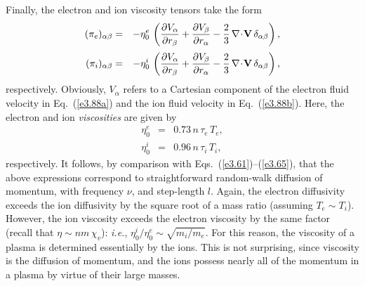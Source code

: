 Finally, the electron and ion viscosity tensors take the form
\begin{eqnarray}\label{e3.88a}
(\pi_e)_{\alpha\beta}& =& - \eta_0^e\, \left( \frac{\partial V_\alpha}{\partial r_\beta}
+ \frac{\partial V_\beta}{\partial r_\alpha} - \frac{2}{3}\,\nabla\!\cdot\!{\bf V}\,\delta_{\alpha\beta}\right),\\[0.5ex]
(\pi_i)_{\alpha\beta}& =& - \eta_0^i\, \left( \frac{\partial V_\alpha}{\partial r_\beta}
+ \frac{\partial V_\beta}{\partial r_\alpha} - \frac{2}{3}\,\nabla\!\cdot\!{\bf V}\,\delta_{\alpha\beta}
\right),\label{e3.88b}
\end{eqnarray}
respectively. Obviously, $V_\alpha$ refers to a Cartesian component of the
electron fluid velocity in Eq.~(\ref{e3.88a}) and the ion fluid velocity in Eq.~(\ref{e3.88b}).
Here, the electron and ion {\em viscosities}\/ are given
by
\begin{eqnarray}\label{e3.89a}
\eta_0^e &=& 0.73\,n\,\tau_e\,T_e,\\[0.5ex]
\eta_0^i &=& 0.96\,n\,\tau_i\,T_i,\label{e3.89b}
\end{eqnarray}
respectively. 
It follows, by comparison with Eqs.~(\ref{e3.61})--(\ref{e3.65}), that the above expressions
correspond to straightforward random-walk diffusion of momentum, with 
frequency $\nu$, and step-length $l$. Again, the electron diffusivity
exceeds the ion diffusivity by the square root of a mass ratio (assuming
$T_e\sim T_i$).  However,
the ion viscosity exceeds the electron viscosity by the same factor (recall
that $\eta\sim nm\,\chi_v$): {\em i.e.}, $\eta_0^i/\eta_0^e\sim\sqrt{m_i/m_e}$.
For this reason, the viscosity of a plasma is determined essentially by the
ions. This is not surprising, since viscosity is the diffusion of momentum,
and the ions possess nearly all of the momentum in a plasma by virtue of
their large masses.


